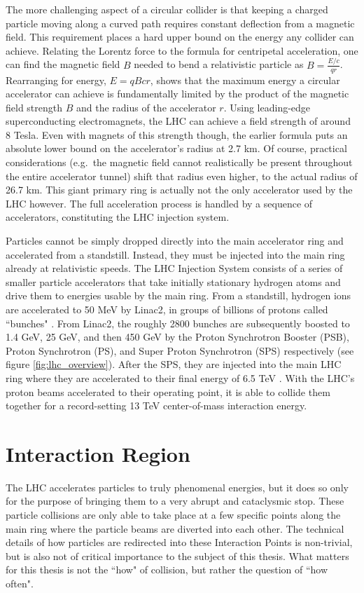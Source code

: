     The more challenging aspect of a circular collider is that keeping a charged particle moving along a curved path requires constant deflection from a magnetic field.
    This requirement places a hard upper bound on the energy any collider can achieve.
    Relating the Lorentz force to the formula for centripetal acceleration, one can find the magnetic field $B$ needed to bend a relativistic particle as $B=\frac{E/c}{q r}$.
    Rearranging for energy, $E = q B c r$, shows that the maximum energy a circular accelerator can achieve is fundamentally limited by the product of the magnetic field strength $B$ and the radius of the accelerator $r$.
    Using leading-edge superconducting electromagnets, the LHC can achieve a field strength of around 8 Tesla.
    Even with magnets of this strength though, the earlier formula puts an absolute lower bound on the accelerator's radius at 2.7 km.
    Of course, practical considerations (e.g.\ the magnetic field cannot realistically be present throughout the entire accelerator tunnel) shift that radius even higher, to the actual radius of 26.7 km.
    This giant primary ring is actually not the only accelerator used by the LHC however.
    The full acceleration process is handled by a sequence of accelerators, constituting the LHC injection system.

    Particles cannot be simply dropped directly into the main accelerator ring and accelerated from a standstill.
    Instead, they must be injected into the main ring already at relativistic speeds.
    The LHC Injection System consists of a series of smaller particle accelerators that take initially stationary hydrogen atoms and drive them to energies usable by the main ring.
    From a standstill, hydrogen ions are accelerated to 50 MeV by Linac2, in groups of billions of protons called ``bunches" \cite{lhc_run2}.
    From Linac2, the roughly 2800 bunches are subsequently boosted to 1.4 GeV, 25 GeV, and then 450 GeV by the Proton Synchrotron Booster (PSB), Proton Synchrotron (PS), and Super Proton Synchrotron (SPS) respectively (see figure \ref{fig:lhc_overview}).
    After the SPS, they are injected into the main LHC ring where they are accelerated to their final energy of 6.5 TeV \cite{lhc_machine}.
    With the LHC's proton beams accelerated to their operating point, it is able to collide them together for a record-setting 13 TeV center-of-mass interaction energy.


\section{Interaction Region} \label{sec:lhc-interaction_region}
    The LHC accelerates particles to truly phenomenal energies, but it does so only for the purpose of bringing them to a very abrupt and cataclysmic stop.
    These particle collisions are only able to take place at a few specific points along the main ring where the particle beams are diverted into each other.
    The technical details of how particles are redirected into these Interaction Points is non-trivial, but is also not of critical importance to the subject of this thesis.
    What matters for this thesis is not the ``how" of collision, but rather the question of ``how often".

